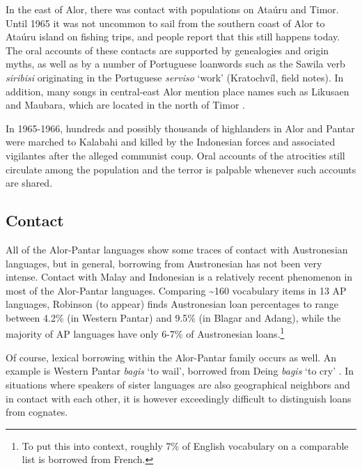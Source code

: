 In the east of Alor, there was contact with populations on Ata\'uru and Timor. Until 1965 it was not uncommon to sail from the southern coast of Alor to Ata\'uru island on fishing trips, and people report that this still happens today. The oral accounts of these contacts are supported by genealogies and origin myths, as well as by a number of Portuguese loanwords such as the Sawila verb \textit{siribisi} originating in the Portuguese \textit{serviso} `work' (Kratochv\'il, field notes). In addition, many songs in central-east Alor mention place names such as Likusaen and Maubara, which are located in the north of Timor \citep{WellfeltEtAl2013}.

In 1965-1966, hundreds and possibly thousands of highlanders in Alor and Pantar were marched to Kalabahi and killed by the Indonesian forces and associated vigilantes after the alleged communist coup. Oral accounts of the atrocities still circulate among the population and the terror is palpable whenever such accounts are shared.

\subsection{Contact}\label{sec:1:4.3}
All of the Alor-Pantar languages show some traces of contact with Austronesian languages, but in general, borrowing from Austronesian has not been very intense. Contact with Malay and Indonesian is a relatively recent phenomenon in most of the Alor-Pantar languages. Comparing \~{}160 vocabulary items in 13 AP languages, Robinson (to appear) finds Austronesian loan percentages to range between 4.2\% (in Western Pantar) and 9.5\% (in Blagar and Adang), while the majority of AP languages have only 6-7\% of Austronesian loans.\footnote{To put this into context,  roughly 7\% of English vocabulary on a comparable list is borrowed from French. 
}

Of course, lexical borrowing within the Alor-Pantar family occurs as well. An example is Western Pantar \textit{bagis} `to wail', borrowed from Deing \textit{bagis} `to cry' \citep{HoltonRobinsonTVhistory}. In situations where speakers of sister languages are also geographical neighbors and in contact with each other, it is however exceedingly difficult to distinguish loans from cognates.


